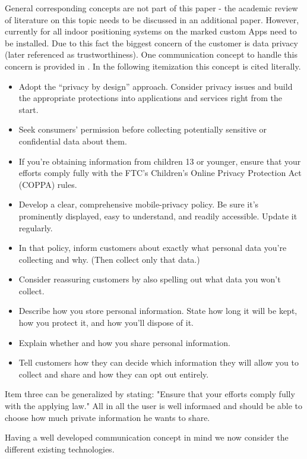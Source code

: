 General corresponding concepts are not part of this paper - the academic review of literature on this topic needs to be discussed in an additional paper. However, currently for all indoor positioning systems on the marked custom Apps need to be installed. Due to this fact the biggest concern of the customer is data privacy (later referenced as trustworthiness). One communication concept to handle this concern is provided in \textcite{mittr}. In the following itemization this concept is cited literally. 



\begin{itemize}
\item Adopt the “privacy by design” approach. Consider privacy issues and build the appropriate protections into applications and services right from the start.
\item Seek consumers’ permission before collecting potentially sensitive or confidential data about them.
\item If you’re obtaining information from children 13 or younger, ensure that your efforts comply fully with the FTC's Children’s Online Privacy Protection Act (COPPA) rules. 
\item Develop a clear, comprehensive mobile-privacy policy. Be sure it’s prominently displayed, easy to understand, and readily accessible. Update it regularly.
\item In that policy, inform customers about exactly what personal data you’re collecting and why. (Then collect only that data.)
\item Consider reassuring customers by also spelling out what data you won’t collect. 
\item Describe how you store personal information. State how long it will be kept, how you protect it, and how you'll dispose of it.
\item Explain whether and how you share personal information.
\item Tell customers how they can decide which information they will allow you to collect and share and how they can opt out entirely.
\end{itemize}

\parencite{mittr}

Item three can be generalized by stating: "Ensure that your efforts comply fully with the applying law." All in all the user is well informaed and should be able to choose how much private information he wants to share.

Having a well developed communication concept in mind we now consider the different existing technologies. 

